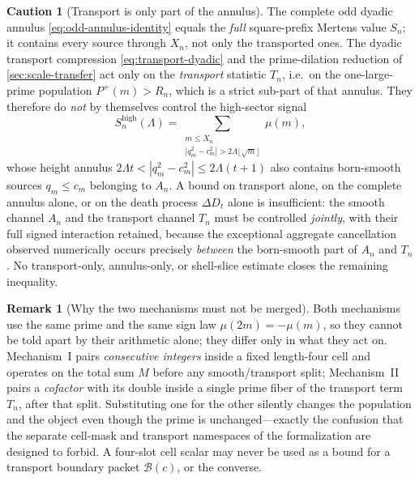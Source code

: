 \documentclass[11pt]{article}
\theoremstyle{definition}
\newtheorem{remark}[theorem]{Remark}
\newtheorem{caution}[theorem]{Caution}
\newcommand{\Pplus}{P^{+}}
\newcommand{\1}{\mathbf{1}}
\begin{document}
\begin{caution}[Transport is only part of the annulus]
\label{warn:transport-partial}
The complete odd dyadic annulus \cref{eq:odd-annulus-identity} equals the \emph{full} square-prefix Mertens value $S_n$; it contains every source through $X_n$, not only the transported ones.  The dyadic transport compression \cref{eq:transport-dyadic} and the prime-dilation reduction of \cref{sec:scale-transfer} act only on the \emph{transport} statistic $T_n$, i.e.\ on the one-large-prime population $\Pplus(m)>R_n$, which is a strict sub-part of that annulus.  They therefore do \emph{not} by themselves control the high-sector signal
\[
 S_n^{\mathrm{high}}(\Lambda)
 =\!\!\sum_{\substack{m\le X_n\\ |q_m^2-c_m^2|>2\Lambda\lfloor\sqrt m\rfloor}}\!\!\mu(m),
\]
whose height annulus $2\Lambda t<|q_m^2-c_m^2|\le2\Lambda(t+1)$ also contains born-smooth sources $q_m\le c_m$ belonging to $A_n$.  A bound on transport alone, on the complete annulus alone, or on the death process $\Delta D_t$ alone is insufficient: the smooth channel $A_n$ and the transport channel $T_n$ must be controlled \emph{jointly}, with their full signed interaction retained, because the exceptional aggregate cancellation observed numerically occurs precisely \emph{between} the born-smooth part of $A_n$ and $T_n$.  No transport-only, annulus-only, or shell-slice estimate closes the remaining inequality.
\end{caution}

\begin{remark}[Why the two mechanisms must not be merged]
\label{rem:no-merge}
Both mechanisms use the same prime and the same sign law $\mu(2m)=-\mu(m)$, so they cannot be told apart by their arithmetic alone; they differ only in what they act on.  Mechanism~I pairs \emph{consecutive integers} inside a fixed length-four cell and operates on the total sum $M$ before any smooth/transport split; Mechanism~II pairs a \emph{cofactor} with its double inside a single prime fiber of the transport term $T_n$, after that split.  Substituting one for the other silently changes the population and the object even though the prime is unchanged---exactly the confusion that the separate cell-mask and transport namespaces of the formalization are designed to forbid.  A four-slot cell scalar may never be used as a bound for a transport boundary packet $\mathcal B(c)$, or the converse.
\end{remark}

\end{document}
